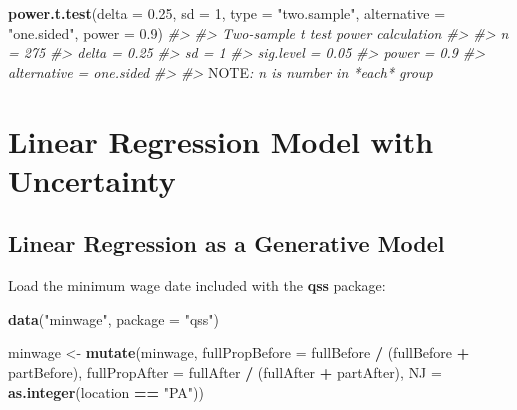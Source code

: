 \documentclass[]{book}
\newenvironment{Shaded}{\begin{snugshade}}{\end{snugshade}}
\newcommand{\AlertTok}[1]{\textcolor[rgb]{0.94,0.16,0.16}{#1}}
\newcommand{\CommentTok}[1]{\textcolor[rgb]{0.56,0.35,0.01}{\textit{#1}}}
\newcommand{\DataTypeTok}[1]{\textcolor[rgb]{0.13,0.29,0.53}{#1}}
\newcommand{\DecValTok}[1]{\textcolor[rgb]{0.00,0.00,0.81}{#1}}
\newcommand{\FloatTok}[1]{\textcolor[rgb]{0.00,0.00,0.81}{#1}}
\newcommand{\KeywordTok}[1]{\textcolor[rgb]{0.13,0.29,0.53}{\textbf{#1}}}
\newcommand{\NormalTok}[1]{#1}
\newcommand{\OperatorTok}[1]{\textcolor[rgb]{0.81,0.36,0.00}{\textbf{#1}}}
\newcommand{\StringTok}[1]{\textcolor[rgb]{0.31,0.60,0.02}{#1}}
\theoremstyle{definition}
\theoremstyle{definition}
\theoremstyle{definition}
\theoremstyle{remark}
\begin{document}
\begin{Shaded}
\begin{Highlighting}[]
\KeywordTok{power.t.test}\NormalTok{(}\DataTypeTok{delta =} \FloatTok{0.25}\NormalTok{, }\DataTypeTok{sd =} \DecValTok{1}\NormalTok{, }\DataTypeTok{type =} \StringTok{"two.sample"}\NormalTok{,}
             \DataTypeTok{alternative =} \StringTok{"one.sided"}\NormalTok{, }\DataTypeTok{power =} \FloatTok{0.9}\NormalTok{)}
\CommentTok{#> }
\CommentTok{#>      Two-sample t test power calculation }
\CommentTok{#> }
\CommentTok{#>               n = 275}
\CommentTok{#>           delta = 0.25}
\CommentTok{#>              sd = 1}
\CommentTok{#>       sig.level = 0.05}
\CommentTok{#>           power = 0.9}
\CommentTok{#>     alternative = one.sided}
\CommentTok{#> }
\CommentTok{#> }\AlertTok{NOTE}\CommentTok{: n is number in *each* group}
\end{Highlighting}
\end{Shaded}

\hypertarget{linear-regression-model-with-uncertainty}{%
\section{Linear Regression Model with
Uncertainty}\label{linear-regression-model-with-uncertainty}}

\hypertarget{linear-regression-as-a-generative-model}{%
\subsection{Linear Regression as a Generative
Model}\label{linear-regression-as-a-generative-model}}

Load the minimum wage date included with the \textbf{qss} package:

\begin{Shaded}
\begin{Highlighting}[]
\KeywordTok{data}\NormalTok{(}\StringTok{"minwage"}\NormalTok{, }\DataTypeTok{package =} \StringTok{"qss"}\NormalTok{)}
\end{Highlighting}
\end{Shaded}

\begin{Shaded}
\begin{Highlighting}[]
\NormalTok{minwage <-}\StringTok{ }\KeywordTok{mutate}\NormalTok{(minwage,}
                  \DataTypeTok{fullPropBefore =}\NormalTok{ fullBefore }\OperatorTok{/}\StringTok{ }\NormalTok{(fullBefore }\OperatorTok{+}\StringTok{ }\NormalTok{partBefore),}
                  \DataTypeTok{fullPropAfter =}\NormalTok{ fullAfter }\OperatorTok{/}\StringTok{ }\NormalTok{(fullAfter }\OperatorTok{+}\StringTok{ }\NormalTok{partAfter),}
                  \DataTypeTok{NJ =} \KeywordTok{as.integer}\NormalTok{(location }\OperatorTok{==}\StringTok{ "PA"}\NormalTok{))}
\end{Highlighting}
\end{Shaded}
\end{document}

